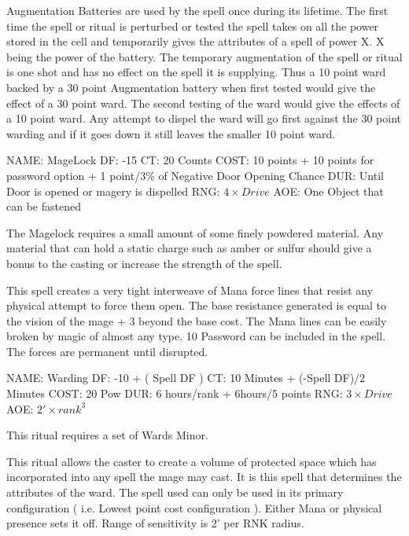 Augmentation Batteries are used by the spell once during its lifetime. The
first time the spell or ritual is perturbed or tested the spell takes on all
the power stored in the cell and temporarily gives the attributes of a spell
of power X. X being the power of the battery. The temporary augmentation of
the spell or ritual is one shot and has no effect on the spell it is
supplying. Thus a 10 point ward backed by a 30 point Augmentation battery
when first tested would give the effect of a 30 point ward. The second
testing of the ward would give the effects of a 10 point ward. Any attempt to
dispel the ward will go first against the 30 point warding and if it goes
down it still leaves the smaller 10 point ward.

\newpage

\spell
NAME: MageLock
DF:   -15
CT:  20 Counts
COST:  10 points + 10 points for password option + 1 point/3\% of Negative Door Opening Chance
DUR:  Until Door is opened or magery is dispelled
RNG: \( 4 \times Drive \)
AOE:  One Object that can be fastened


The Magelock requires a small amount of some finely powdered
material. Any material that can hold a static charge such as amber or
sulfur should give a bonus to the casting or increase the strength of
the spell.


This spell creates a very tight interweave of Mana force lines that
resist any physical attempt to force them open.  The base resistance
generated is equal to the vision of the mage + 3%
beyond the base cost. The Mana lines can be easily broken by magic of almost
any type. 10 %
Password can be included in the spell. The forces are permanent until
disrupted.

\newpage

\spell
NAME: Warding
DF:  -10 + ( Spell DF )
CT:  10 Minutes + (-Spell DF)/2 Minutes
COST:  20 Pow
DUR:  6 hours/rank + 6hours/5 points
RNG:  \( 3 \times Drive \)
AOE:  \( 2' \times rank ^3 \)



This ritual requires a set of Wards Minor.


This ritual allows the caster to create a volume of protected
space which has incorporated into any spell the mage may cast. It is
this spell that determines the attributes of the ward. The spell used
can only be used in its primary configuration ( i.e. Lowest point
cost configuration ). Either Mana or physical presence sets it off.
Range of sensitivity is 2' per RNK radius.

